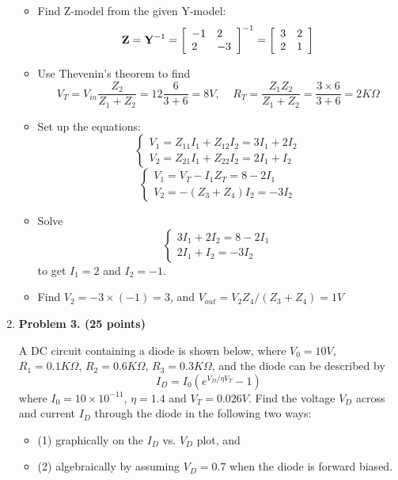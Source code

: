 \begin{enumerate}
\begin{itemize}
 \item Find Z-model from the given Y-model:
 \[ {\bf Z}={\bf Y}^{-1}=
     \left[ \begin{array}{ll} -1 & 2 \\ 2 & -3 \end{array} \right]^{-1}
    =\left[ \begin{array}{ll} 3 & 2 \\ 2 & 1 \end{array} \right] \]
 \item Use Thevenin's theorem to find
 \[ V_{T}=V_{in} \frac{Z_2}{Z_1+Z_2}=12\frac{6}{3+6}=8V,\;\;\;\;
    R_T=\frac{Z_1 Z_2}{Z_1+Z_2}=\frac{3\times 6}{3+6}=2K\Omega  \]
 \item Set up the equations:
 \[ \left\{ \begin{array}{l} V_1=Z_{11}I_1+Z_{12}I_2=3I_1+2I_2 \\
 	V_2=Z_{21}I_1+Z_{22}I_2=2I_1+I_2 \end{array} \right. \]
 \[ \left\{ \begin{array}{l} V_1=V_T-I_1 Z_T=8-2I_1 \\ V_2=-(Z_3+Z_4)I_2=-3I_2 
 \end{array} \right. \]
 \item Solve 
 \[ \left\{ \begin{array}{l} 3I_1+2I_2=8-2I_1 \\ 2I_1+I_2=-3I_2 \end{array} \right. \]
 to get $I_1=2$ and $I_2=-1$. 
 \item Find $V_2=-3\times (-1)=3$, and $V_{out}=V_2 Z_4/(Z_3+Z_4)=1V$
 \end{itemize}

\item {\bf Problem 3. (25 points)} 

A DC circuit containing a diode is shown below, where $V_0=10V$, $R_1=0.1K\Omega$,
$R_2=0.6K\Omega$, $R_3=0.3K\Omega$, and the diode can be described by
\[ I_D=I_0 ( e^{V_D/\eta V_T}-1 ) \]
where $I_0=10\times 10^{-11}$, $\eta=1.4$ and $V_T=0.026V$. Find the voltage 
$V_D$ across and current $I_D$ through the diode in the following two ways:
\begin{itemize}
\item (1) graphically on the $I_D$ vs. $V_D$ plot, and
\item (2) algebraically by assuming $V_D=0.7$ when the diode is forward biased.
\end{itemize}



\end{enumerate}
